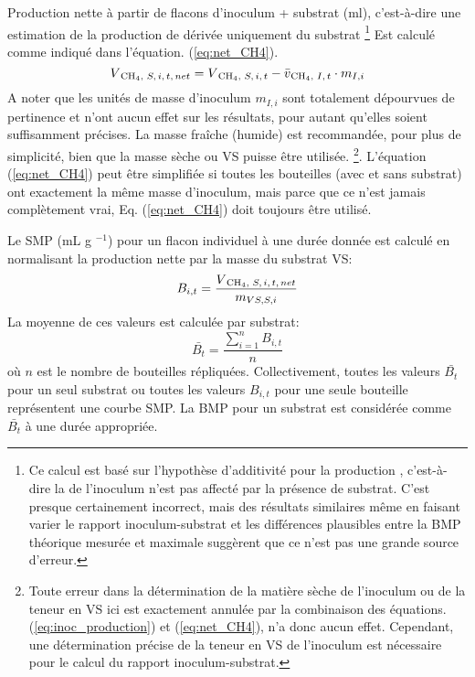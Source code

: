 \documentclass[]{article}
\begin{document}
Production nette  à partir de flacons d’inoculum + substrat (ml), c’est-à-dire une estimation de la production de  dérivée uniquement du substrat \footnote{Ce calcul est basé sur l’hypothèse d’additivité pour la production , c’est-à-dire la  de l'inoculum n'est pas affecté par la présence de substrat. C'est presque certainement incorrect, mais des résultats similaires même en faisant varier le rapport inoculum-substrat et les différences plausibles entre la BMP théorique mesurée et maximale suggèrent que ce n'est pas une grande source d'erreur.} Est calculé comme indiqué dans l'équation. (\ref{eq:net_CH4}).
\begin{equation}
  \label{eq:net_CH4}
  V\textsubscript{CH$_4$, $S, i, t, net$} = V\textsubscript{CH$_4$, $S, i, t$} - \bar{v}\textsubscript{{CH$_4$, $I, t$}} \cdot m_{I, i}
\end{equation}
A noter que les unités de masse d'inoculum $m_{I, i}$ sont totalement dépourvues de pertinence et n'ont aucun effet sur les résultats, pour autant qu'elles soient suffisamment précises.
La masse fraîche (humide) est recommandée, pour plus de simplicité, bien que la masse sèche ou VS puisse être utilisée. \footnote{Toute erreur dans la détermination de la matière sèche de l'inoculum ou de la teneur en VS ici est exactement annulée par la combinaison des équations. (\ref{eq:inoc_production}) et (\ref{eq:net_CH4}), n'a donc aucun effet. Cependant, une détermination précise de la teneur en VS de l'inoculum est nécessaire pour le calcul du rapport inoculum-substrat.}.
L'équation (\ref{eq:net_CH4}) peut être simplifiée si toutes les bouteilles (avec et sans substrat) ont exactement la même masse d'inoculum, mais parce que ce n'est jamais complètement vrai, Eq. (\ref{eq:net_CH4}) doit toujours être utilisé.

Le SMP (mL g $^{-1}$) pour un flacon individuel à une durée donnée est calculé en normalisant la production nette  par la masse du substrat VS:
\begin{equation}
  \label{eq:yield}
  B_{i, t} = \frac {V\textsubscript{CH$_4$, $S, i, t, net$} }  { m_{VS, S, i}}
\end{equation}
La moyenne de ces valeurs est calculée par substrat:
\begin{equation}
  \label{eq:BMP}
  \bar{B_t} = \frac {\sum_{i = 1} ^n B_{i, t}} {n}
\end{equation}
où $n$ est le nombre de bouteilles répliquées.
Collectivement, toutes les valeurs $\bar{B_t}$ pour un seul substrat ou toutes les valeurs $B_{i, t}$ pour une seule bouteille représentent une courbe SMP.
La BMP pour un substrat est considérée comme $\bar{B_t}$ à une durée appropriée.
\end{document}
